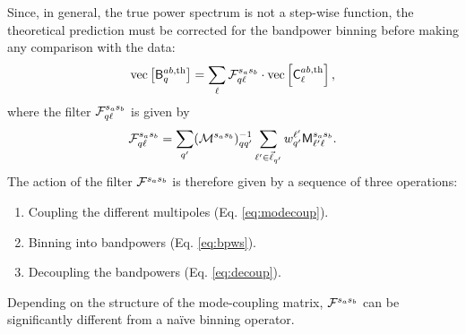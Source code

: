 \documentclass[usenatbib]{mnrasb}
\begin{document}
        Since, in general, the true power spectrum is not a step-wise function, the theoretical prediction must be corrected for the bandpower binning before making any comparison with the data:
        \begin{equation}\label{eq:theory_correct}
          {\rm vec}\left[{\sf B}^{ab,{\rm th}}_q\right]=\sum_{\ell}{\cal F}^{s_as_b}_{q\ell}\cdot{\rm vec}\left[{\sf C}^{ab,{\rm th}}_\ell\right],
        \end{equation}
        where the filter ${\cal F}^{s_as_b}_{q\ell}$ is given by
        \begin{equation}\label{eq:bpresponse}
          {\cal F}^{s_as_b}_{q\ell}=\sum_{q'}({\cal M}^{s_as_b})^{-1}_{qq'}\sum_{\ell'\in\vec{\ell}_{q'}}w_{q'}^{\ell'}{\sf M}^{s_as_b}_{\ell'\ell}.
        \end{equation}
        The action of the filter ${\cal F}^{s_as_b}$ is therefore given by a sequence of three operations:
        \begin{enumerate}
          \item Coupling the different multipoles (Eq. \ref{eq:modecoup}).
          \item Binning into bandpowers (Eq. \ref{eq:bpws}).
          \item Decoupling the bandpowers (Eq. \ref{eq:decoup}).
        \end{enumerate}
        Depending on the structure of the mode-coupling matrix, ${\cal F}^{s_as_b}$ can be significantly different from a na\"ive binning operator.
        
\end{document}
